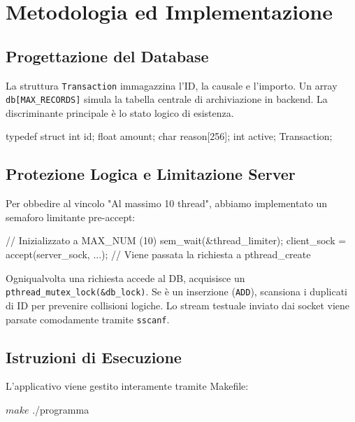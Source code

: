 \documentclass[a4paper,12pt]{article}
\begin{document}
\section{Metodologia ed Implementazione}

\subsection{Progettazione del Database}
La struttura \texttt{Transaction} immagazzina l'ID, la causale e l'importo. Un array \texttt{db[MAX\_RECORDS]} simula la tabella centrale di archiviazione in backend. La discriminante principale è lo stato logico di esistenza.
\begin{ccode}
typedef struct {
    int id;
    float amount;
    char reason[256];
    int active;
} Transaction;
\end{ccode}

\subsection{Protezione Logica e Limitazione Server}
Per obbedire al vincolo "Al massimo 10 thread", abbiamo implementato un semaforo limitante pre-accept:
\begin{ccode}
// Inizializzato a MAX_NUM (10)
sem_wait(&thread_limiter); 
client_sock = accept(server_sock, ...);
// Viene passata la richiesta a pthread_create
\end{ccode}
Ogniqualvolta una richiesta accede al DB, acquisisce un \texttt{pthread\_mutex\_lock(\&db\_lock)}. Se è un inserzione (\texttt{ADD}), scansiona i duplicati di ID per prevenire collisioni logiche. Lo stream testuale inviato dai socket viene parsate comodamente tramite \texttt{sscanf}.


\subsection{Istruzioni di Esecuzione}
L'applicativo viene gestito interamente tramite Makefile:
\begin{terminal}
$ make
$ ./programma
\end{terminal}
\end{document}

